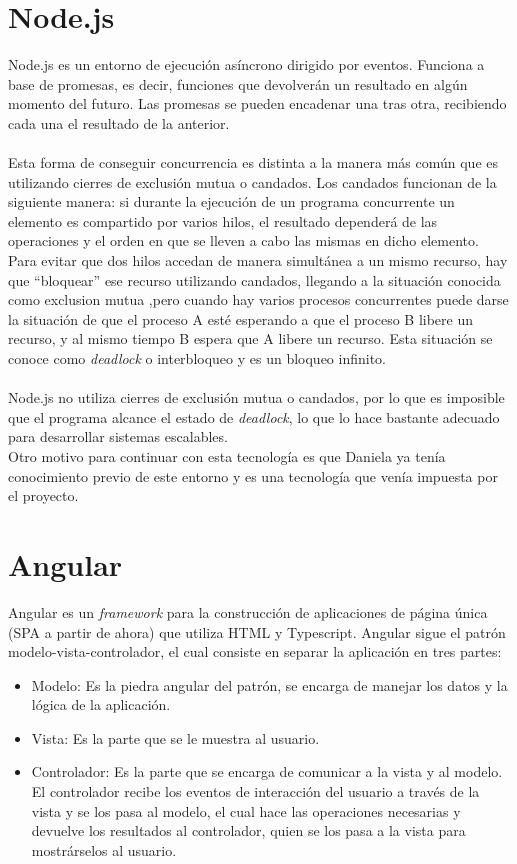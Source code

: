 \documentclass[11pt]{book}
\begin{document}
\section{Node.js} 
Node.js \cite{node} es un entorno de ejecución asíncrono dirigido por eventos. Funciona a base de promesas, es decir, funciones que devolverán un resultado en algún momento del futuro. Las promesas se pueden encadenar una tras otra, recibiendo cada una el resultado de la anterior.\\\\
Esta forma de conseguir concurrencia es distinta a la manera más común que es utilizando cierres de exclusión mutua o candados. Los candados funcionan de la siguiente manera: si durante la ejecución de un programa concurrente un elemento es compartido por varios hilos, el resultado dependerá de las operaciones y el orden en que se lleven a cabo las mismas en dicho elemento. Para evitar que dos hilos accedan de manera simultánea a un mismo recurso, hay que ``bloquear'' ese recurso utilizando candados, llegando a la situación conocida como exclusion mutua ,pero cuando hay varios procesos concurrentes puede darse la situación de que el proceso A esté esperando a que el proceso B libere un recurso, y al mismo tiempo B espera que A libere un recurso. Esta situación se conoce como \emph{deadlock} o interbloqueo y es un bloqueo infinito.\\\\
Node.js no utiliza cierres de exclusión mutua o candados, por lo que es imposible que el programa alcance el estado de \emph{deadlock}, lo que lo hace bastante adecuado para desarrollar sistemas escalables.\\
Otro motivo para continuar con esta tecnología es que Daniela ya tenía conocimiento previo de este entorno y es una tecnología que venía impuesta por el proyecto.

\section{Angular}
Angular \cite{angular} es un \emph{framework} para la construcción de aplicaciones de página única (SPA a partir de ahora) que utiliza HTML y Typescript. Angular sigue el patrón modelo-vista-controlador, el cual consiste en separar la aplicación en tres partes:
\begin{itemize}
	\item Modelo: Es la piedra angular del patrón, se encarga de manejar los datos y la lógica de la aplicación.
	\item Vista: Es la parte que se le muestra al usuario.
	\item Controlador: Es la parte que se encarga de comunicar a la vista y al modelo. El controlador recibe los eventos de interacción del usuario a través de la vista y se los pasa al modelo, el cual hace las operaciones necesarias y devuelve los resultados al controlador, quien se los pasa a la vista para mostrárselos al usuario.
\end{itemize}
\end{document}
